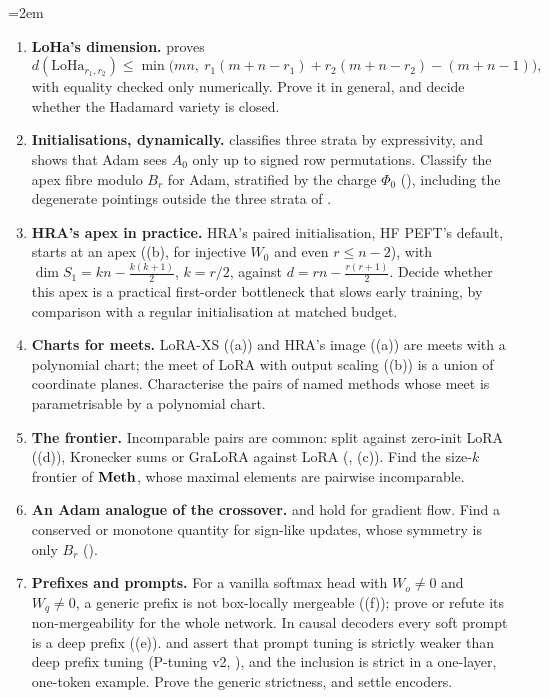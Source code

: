 \begingroup\emergencystretch=2em
\begin{enumerate}[label=\arabic*.,leftmargin=1.8em,itemsep=4pt]
  \item \textbf{LoHa's dimension.}  proves
    \begin{equation}\label{eq:open-loha}
      d(\mathrm{LoHa}_{r_1,r_2})\le\min\big(mn,\ r_1(m+n-r_1)+r_2(m+n-r_2)-(m+n-1)\big),
    \end{equation}
    with equality checked only numerically. Prove it in general, and decide whether the Hadamard variety is closed.
  \item \textbf{Initialisations, dynamically.}  classifies three strata by expressivity, and
     shows that Adam sees $A_0$ only up to signed row permutations. Classify the apex fibre
    modulo $B_r$ for Adam, stratified by the charge $\Phi_0$ (), including the degenerate
    pointings outside the three strata of .
  \item \textbf{HRA's apex in practice.} HRA's paired initialisation, HF PEFT's default, starts at an apex
    ((b), for injective $W_0$ and even $r\le n-2$), with $\dim S_1=kn-\tfrac{k(k+1)}2$, $k=r/2$,
    against $d=rn-\tfrac{r(r+1)}2$. Decide whether this apex is a practical first-order bottleneck that slows early
    training, by comparison with a regular initialisation at matched budget.
  \item \textbf{Charts for meets.} LoRA-XS ((a)) and HRA's image ((a))
    are meets with a polynomial chart; the meet of LoRA with output scaling ((b)) is a union of
    coordinate planes. Characterise the pairs of named methods whose meet is parametrisable by a polynomial chart.
  \item \textbf{The frontier.} Incomparable pairs are common: split against zero-init LoRA ((d)),
    Kronecker sums or GraLoRA against LoRA (, (c)). Find the size-$k$
    frontier of $\mathbf{Meth}$, whose maximal elements are pairwise incomparable.
  \item \textbf{An Adam analogue of the crossover.}  and  hold for
    gradient flow. Find a conserved or monotone quantity for sign-like updates, whose symmetry is only $B_r$
    ().
  \item \textbf{Prefixes and prompts.} For a vanilla softmax head with $W_o\ne0$ and $W_q\ne0$, a generic prefix is not
    box-locally mergeable ((f)); prove or refute its non-mergeability for the whole network. In causal decoders every soft prompt is a deep prefix
    ((e)). \citet{petrov2023prompting} and \citet{li2021prefix} assert that prompt tuning is
    strictly weaker than deep prefix tuning (P-tuning v2, \citealp{liu2021p}), and the inclusion is strict in a
    one-layer, one-token example. Prove the generic strictness, and settle encoders.
\end{enumerate}
\endgroup

